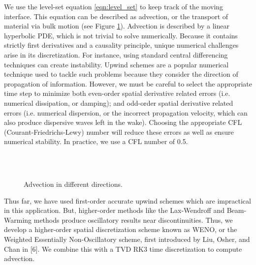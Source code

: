 \documentclass[oneside,12pt,final]{/Applications/TeX/packages/ucthesis-CA2012}
\begin{document}
\begin{mainmatter}
We use the level-set equation \eqref{eqn:level_set} to keep track of the moving interface. This equation can be described as advection, or the transport of material via bulk motion (see Figure \ref{fig:advection}). Advection is described by a linear hyperbolic PDE, which is not trivial to solve numerically. Because it contains strictly first derivatives and a causality principle, unique numerical challenges arise in its discretization. For instance, using standard central differencing techniques can create instability. Upwind schemes are a popular numerical technique used to tackle such problems because they consider the direction of propagation of information. However, we must be careful to select the appropriate time step to minimize both even-order spatial derivative related errors (i.e. numerical dissipation, or damping); and odd-order spatial derivative related errors (i.e. numerical dispersion, or the incorrect propagation velocity, which can also produce dispersive waves left in the wake). Choosing the appropriate CFL (Courant-Friedrichs-Lewy) number will reduce these errors as well as ensure numerical stability. In practice, we use a CFL number of 0.5.

\begin{figure} [!h]
\centering
{}\\
 \quad
{}\\
 \quad
{}
  \caption[Advection]{Advection in different directions.}
  \label{fig:advection}
\end{figure}

Thus far, we have used first-order accurate upwind schemes which are impractical in this application. But, higher-order methods like the Lax-Wendroff and Beam-Warming methods produce oscillatory results near discontinuities. Thus, we develop a higher-order spatial discretization scheme known as WENO, or the Weighted Essentially Non-Oscillatory scheme, first introduced by Liu, Osher, and Chan in [6]. We combine this with a TVD RK3 time discretization to compute advection.


\end{mainmatter}
\end{document}
